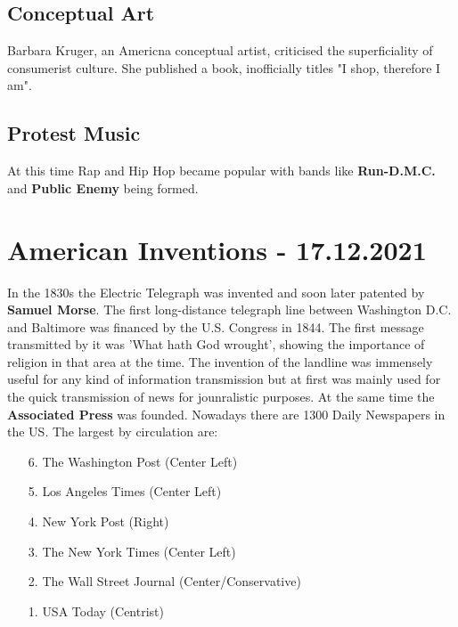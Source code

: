 \documentclass{article}
\begin{document}
	\subsection{Conceptual Art}
	Barbara Kruger, an Americna conceptual artist, criticised the superficiality of consumerist culture. She published a book, inofficially titles "I shop, therefore I am". \\
	\subsection{Protest Music}
	At this time Rap and Hip Hop became popular with bands like \textbf{Run-D.M.C.} and \textbf{Public Enemy} being formed. \\

	\section{American Inventions - 17.12.2021}
	In the 1830s the Electric Telegraph was invented and soon later patented by \textbf{Samuel Morse}. The first long-distance telegraph line between Washington D.C. and Baltimore was financed by the U.S. Congress in 1844. The first message transmitted by it was 'What hath God wrought', showing the importance of religion in that area at the time. The invention of the landline was immensely useful for any kind of information transmission but at first was mainly used for the quick transmission of news for jounralistic purposes.
	At the same time the \textbf{Associated Press} was founded. Nowadays there are 1300 Daily Newspapers in the US. The largest by circulation are:
	\begin{itemize}
		\item[6.]{The Washington Post (Center Left)}
		\item[5.]{Los Angeles Times (Center Left)}
		\item[4.]{New York Post (Right)}
		\item[3.]{The New York Times (Center Left)}
		\item[2.]{The Wall Street Journal (Center/Conservative)}
		\item[1.]{USA Today (Centrist)}
	\end{itemize}
\end{document}
